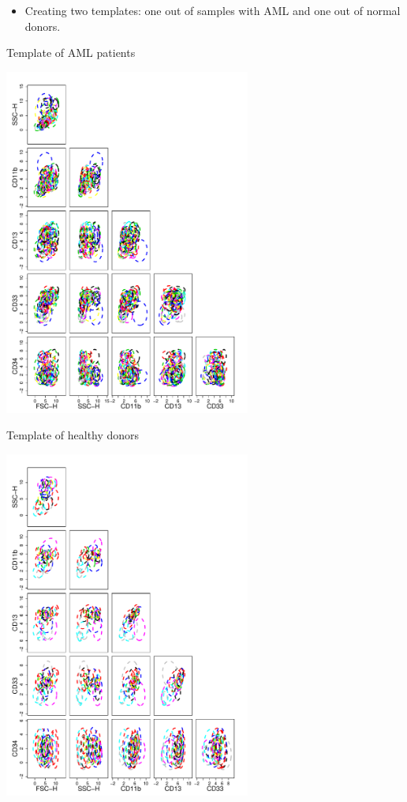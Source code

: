 \documentclass[landscape]{sciposter}
\begin{document}
\begin{multicols}{5}
\begin{figure}[h]
\end{figure}
\vspace*{-0.8cm}
\begin{itemize}
\item Creating two templates:
one out of samples with AML and one out of normal donors.
\end{itemize}
\begin{minipage}[b]{0.5\linewidth}
\caption{\small Template of AML patients}
\includegraphics[scale=0.50, height=4.5in]{images/labeled-aml-mc.pdf}
\end{minipage} \hfill
\begin{minipage} [b]{0.5\linewidth}
\caption{\small Template of healthy donors}
\includegraphics[scale=0.50, height=4.5in]{images/labeled-healthy-mc.pdf}

\end{minipage}
\end{multicols}
\end{document}
